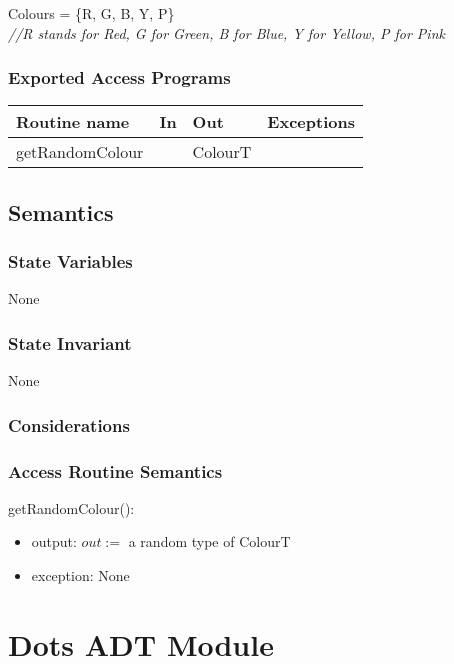 \documentclass[12pt]{article}
\begin{document}
Colours = \{R, G, B, Y, P\}\\

\noindent \textit{//R stands for Red, G for Green, B for Blue, Y for
  Yellow, P for Pink}

\subsubsection* {Exported Access Programs}

\begin{tabular}{| l | l | l | l |}
\hline
\textbf{Routine name} & \textbf{In} & \textbf{Out} & \textbf{Exceptions}\\
\hline
getRandomColour & ~ & ColourT & \\
\hline
\end{tabular}

\subsection* {Semantics}

\subsubsection* {State Variables}

None

\subsubsection* {State Invariant}

None

\subsubsection* {Considerations}

\newpage

\subsubsection* {Access Routine Semantics}

getRandomColour():
\begin{itemize}
\item output: $out := $ a random type of ColourT
\item exception: None
\end{itemize}


\newpage

\section* {Dots ADT Module}
\end{document}
